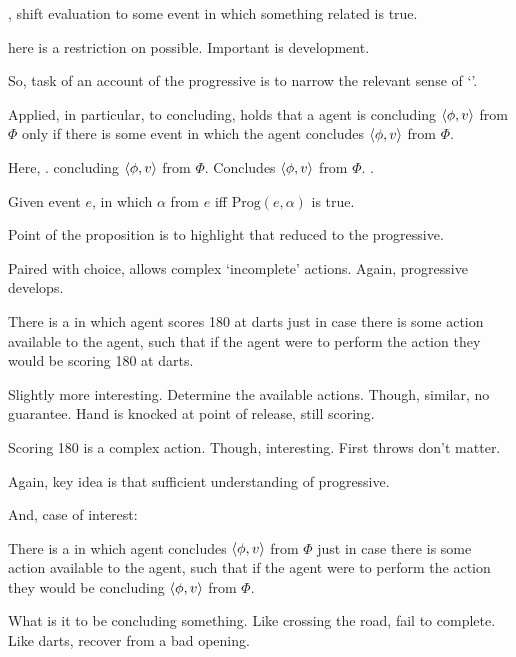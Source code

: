 \begin{note}
  , shift evaluation to some  event in which something related is true.

   here is a restriction on possible.
  Important is development.

  So, task of an account of the progressive is to narrow the relevant sense of `'.

  Applied, in particular, to concluding,  holds that a agent is concluding \(\langle \phi, v \rangle\) from \(\Phi\) only if there is some  event in which the agent concludes \(\langle \phi, v \rangle\) from \(\Phi\).

  Here, \fc{}.
  concluding \(\langle \phi, v \rangle\) from \(\Phi\).
  Concludes \(\langle \phi, v \rangle\) from \(\Phi\).
  .
\end{note}

\begin{note}
  \begin{proposition}
    Given event \(e\), \pevent{} in which \(\alpha\) from \(e\) iff \(\text{Prog}(e,\alpha)\) is true.
  \end{proposition}

  Point of the proposition is to highlight that reduced \pevent{} to the progressive.
\end{note}

\begin{note}
  Paired with choice, allows complex `incomplete' actions.
  Again, progressive develops.

  \begin{illustration}[Darts]
    There is a \pevent{} in which agent scores 180 at darts just in case there is some action available to the agent, such that if the agent were to perform the action they would be scoring 180 at darts.
  \end{illustration}

  Slightly more interesting.
  Determine the available actions.
  Though, similar, no guarantee.
  Hand is knocked at point of release, still scoring.

  Scoring 180 is a complex action.
  Though, interesting.
  First throws don't matter.

  Again, key idea is that sufficient understanding of progressive.

  And, case of interest:

  \begin{illustration}[Concluding]
    There is a \pevent{} in which agent concludes \(\langle \phi, v \rangle\) from \(\Phi\) just in case there is some action available to the agent, such that if the agent were to perform the action they would be concluding \(\langle \phi, v \rangle\) from \(\Phi\).
  \end{illustration}

  What is it to be concluding something.
  Like crossing the road, fail to complete.
  Like darts, recover from a bad opening.
\end{note}

